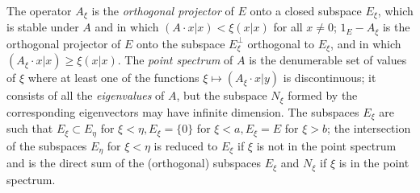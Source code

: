 \documentclass[12pt,a4paper,leqno,twoside]{extbook}
\begin{document}
The operator \(A_\xi\) is the \emph{orthogonal projector} of \(E\) onto a closed subspace \(E_\xi\), which is stable under \(A\) and in which \((A \cdot x|x) < \xi(x|x)\) for all \(x \neq 0\); \(1_E - A_\xi\) is the orthogonal projector of \(E\) onto the subspace \(E_\xi^\perp\) orthogonal to \(E_\xi\), and in which \((A_\xi \cdot x|x) \geq \xi(x|x)\). The \emph{point spectrum} of \(A\) is the denumerable set of values of \(\xi\) where at least one of the functions \(\xi \mapsto (A_\xi \cdot x|y)\) is discontinuous; it consists of all the \emph{eigenvalues} of \(A\), but the subspace \(N_\xi\) formed by the corresponding eigenvectors may have infinite dimension. The subspaces \(E_\xi\) are such that \(E_\xi \subset E_\eta\) for \(\xi < \eta, E_\xi = \{0\}\) for \(\xi < a, E_\xi = E\) for \(\xi > b\); the intersection of the subspaces \(E_\eta\) for \(\xi < \eta\) is reduced to \(E_\xi\) if \(\xi\) is not in the point spectrum and is the direct sum of the (orthogonal) subspaces \(E_\xi\) and \(N_\xi\) if \(\xi\) is in the point spectrum.
\end{document}

